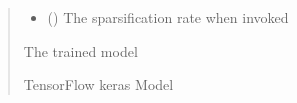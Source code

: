 \documentclass[letterpaper,10pt,english]{sphinxmanual}
\begin{document}
\begin{fulllineitems}
\begin{quote}
\begin{description}
\begin{itemize}
\item {} 
\sphinxAtStartPar
{} (\sphinxstyleliteralemphasis{\sphinxupquote{ (}}\sphinxstyleliteralemphasis{\sphinxupquote{)}}) \textendash{} The sparsification rate when invoked

\end{itemize}

\sphinxAtStartPar
{} \textendash{} The trained model

\sphinxAtStartPar
TensorFlow keras Model

\end{description}\end{quote}

\end{fulllineitems}
\end{document}
